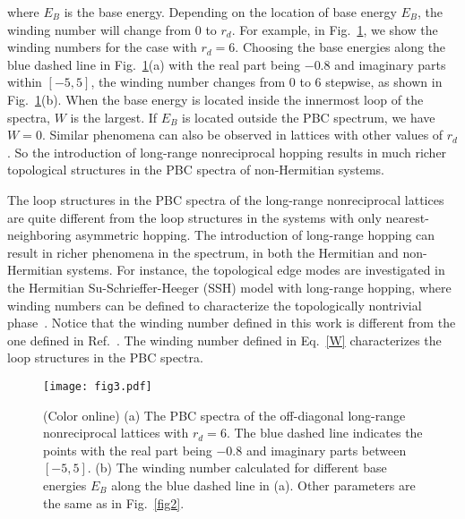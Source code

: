 \documentclass[prb,aps,twocolumn,showpacs]{revtex4-2} %
\begin{document}
where $E_B$ is the base energy. Depending on the location of base energy $E_B$, the winding number will change from $0$ to $r_d$. For example, in Fig.~\ref{fig3}, we show the winding numbers for the case with $r_d=6$. Choosing the base energies along the blue dashed line in Fig.~\ref{fig3}(a) with the real part being $-0.8$ and imaginary parts within $[-5,5]$, the winding number changes from $0$ to $6$ stepwise, as shown in Fig.~\ref{fig3}(b). When the base energy is located inside the innermost loop of the spectra, $W$ is the largest. If $E_B$ is located outside the PBC spectrum, we have $W=0$. Similar phenomena can also be observed in lattices with other values of $r_d$. So the introduction of long-range nonreciprocal hopping results in much richer topological structures in the PBC spectra of non-Hermitian systems.

The loop structures in the PBC spectra of the long-range nonreciprocal lattices are quite different from the loop structures in the systems with only nearest-neighboring asymmetric hopping. The introduction of long-range hopping can result in richer phenomena in the spectrum, in both the Hermitian and non-Hermitian systems. For instance, the topological edge modes are investigated in the Hermitian Su-Schrieffer-Heeger (SSH) model with long-range hopping, where winding numbers can be defined to characterize the topologically nontrivial phase~\cite{Dias2022PRB}. Notice that the winding number defined in this work is different from the one defined in Ref.~\cite{Dias2022PRB}. The winding number defined in Eq.~\ref{W} characterizes the loop structures in the PBC spectra.

\begin{figure}[t]
  \texttt{[image: fig3.pdf]}
  \caption{(Color online) (a) The PBC spectra of the off-diagonal long-range nonreciprocal lattices with $r_d=6$. The blue dashed line indicates the points with the real part being $-0.8$ and imaginary parts between $[-5,5]$. (b) The winding number calculated for different base energies $E_B$ along the blue dashed line in (a). Other parameters are the same as in Fig.~\ref{fig2}.}
\label{fig3}
\end{figure}
\end{document}
